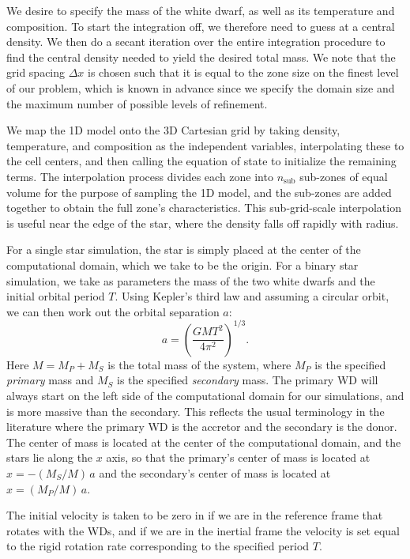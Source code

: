 \documentclass{emulateapj}
\begin{document}
We desire to specify the mass of the white dwarf, as well as its
temperature and composition. To start the integration off, we
therefore need to guess at a central density.  We then do a secant
iteration over the entire integration procedure to find the central
density needed to yield the desired total mass.  We note that the grid
spacing $\Delta x$ is chosen such that it is equal to the zone size on
the finest level of our problem, which is known in advance since we
specify the domain size and the maximum number of possible levels of
refinement.

We map the 1D model onto the 3D Cartesian grid by taking density,
temperature, and composition as the independent variables,
interpolating these to the cell centers, and then calling the equation
of state to initialize the remaining terms.  The interpolation process
divides each zone into $n_{\text{sub}}$ sub-zones of equal volume for
the purpose of sampling the 1D model, and the sub-zones are added
together to obtain the full zone's characteristics. This
sub-grid-scale interpolation is useful near the edge of the star,
where the density falls off rapidly with radius.

For a single star simulation, the star is simply placed at the center
of the computational domain, which we take to be the origin. For a
binary star simulation, we take as parameters the mass of the two
white dwarfs and the initial orbital period $T$. Using Kepler's third
law and assuming a circular orbit, we can then work out the orbital
separation $a$:
\begin{equation}
  a = \left(\frac{GM T^2}{4\pi^2}\right)^{1/3}.
\end{equation}
Here $M = M_P + M_S$ is the total mass of the system, where $M_P$ is
the specified \textit{primary} mass and $M_S$ is the specified
\textit{secondary} mass. The primary WD will always start on the left
side of the computational domain for our simulations, and is more
massive than the secondary. This reflects the usual terminology in the
literature where the primary WD is the accretor and the secondary is
the donor. The center of mass is located at the center of the
computational domain, and the stars lie along the $x$ axis, so that
the primary's center of mass is located at $x = -(M_S / M)\, a$ and
the secondary's center of mass is located at $x = (M_P / M)\, a$.

The initial velocity is taken to be zero in if we are in the reference
frame that rotates with the WDs, and if we are in the inertial frame
the velocity is set equal to the rigid rotation rate corresponding to
the specified period $T$.
\end{document}
